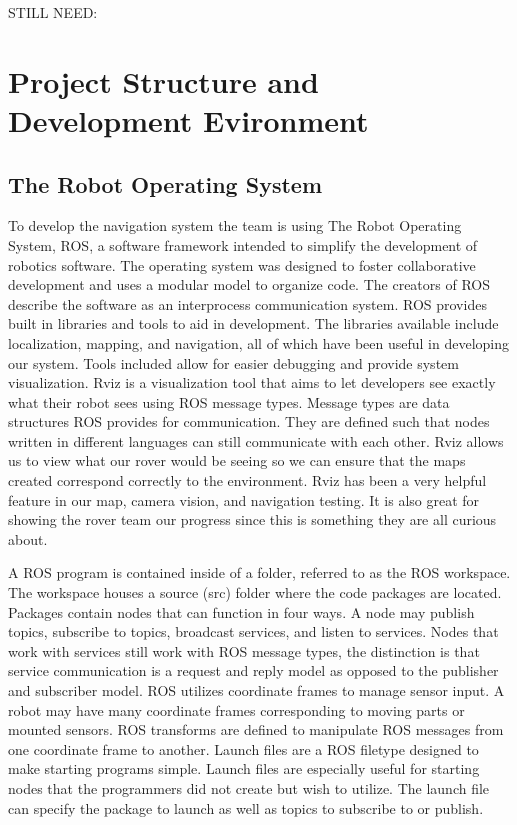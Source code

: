 \documentclass[10pt, oneside,onecolumn]{IEEEtran}
\begin{document}
STILL NEED:

\section{Project Structure and Development Evironment}
\subsection{The Robot Operating System }
To develop the navigation system the team is using The Robot Operating System, ROS, a software framework intended to simplify the development of robotics software. The operating system was designed to foster collaborative development and uses a modular model to organize code. The creators of ROS describe the software as an interprocess communication system. ROS provides built in libraries and tools to aid in development. The libraries available include localization, mapping, and navigation, all of which have been useful in developing our system. Tools included allow for easier debugging and provide system visualization. Rviz is a visualization tool that aims to let developers see exactly what their robot sees using ROS message types. Message types are data structures ROS provides for communication. They are defined such that nodes written in different languages can still communicate with each other. Rviz allows us to view what our rover would be seeing so we can ensure that the maps created correspond correctly to the environment. Rviz has been a very helpful feature in our map, camera vision, and navigation testing. It is also great for showing the rover team our progress since this is something they are all curious about.

A ROS program is contained inside of a folder, referred to as the ROS workspace. The workspace houses a source (src) folder where the code packages are located. Packages contain nodes that can function in four ways. A node may publish topics, subscribe to topics, broadcast services, and listen to services. Nodes that work with services still work with ROS message types, the distinction is that service communication is a request and reply model as opposed to the publisher and subscriber model. ROS utilizes coordinate frames to manage sensor input. A robot may have many coordinate frames corresponding to moving parts or mounted sensors. ROS transforms are defined to manipulate ROS messages from one coordinate frame to another. Launch files are a ROS filetype designed to make starting programs simple. Launch files are especially useful for starting nodes that the programmers did not create but wish to utilize. The launch file can specify the package to launch as well as topics to subscribe to or publish. 
\end{document}
